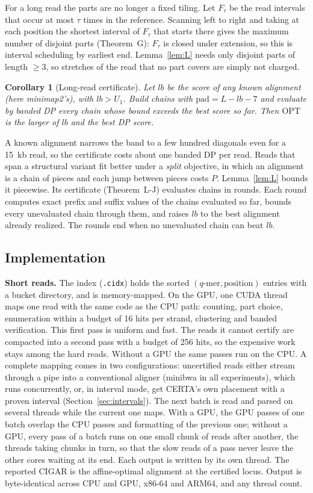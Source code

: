 \documentclass[11pt]{article}
\newtheorem{corollary}[theorem]{Corollary}
\theoremstyle{definition}
\newcommand{\OPT}{\mathrm{OPT}}
\newcommand{\pad}{\mathrm{pad}}
\begin{document}
For a long read the parts are no longer a fixed tiling. Let $F_\tau$ be the
read intervals that occur at most $\tau$ times in the reference. Scanning
left to right and taking at each position the shortest interval of
$F_\tau$ that starts there gives the maximum number of disjoint parts
(Theorem~G): $F_\tau$ is closed under extension, so this is interval
scheduling by earliest end. Lemma~\ref{lem:L} needs only disjoint parts of
length $\ge3$, so stretches of the read that no part covers are simply not
charged.

\begin{corollary}[Long-read certificate]\label{cor:long}
Let $lb$ be the score of any known alignment (here minimap2's), with
$lb>U_1$. Build chains with $\pad=L-lb-7$ and evaluate by banded DP every
chain whose bound exceeds the best score so far. Then $\OPT$ is the larger
of $lb$ and the best DP score.
\end{corollary}

A known alignment narrows the band to a few hundred diagonals even for a
15~kb read, so the certificate costs about one banded DP per read. Reads
that span a structural variant fit better under a \emph{split}
objective, in which an alignment is a chain of pieces and each jump between
pieces costs $P$. Lemma~\ref{lem:L} bounds it piecewise. Its certificate
(Theorem~L-J) evaluates chains in rounds. Each round computes exact
prefix and suffix values of the chains evaluated so far, bounds every
unevaluated chain through them, and raises $lb$ to the best alignment
already realized. The rounds end when no unevaluated chain can beat $lb$.

\subsection{Implementation}

\textbf{Short reads.} The index (\texttt{.cidx}) holds the sorted
$(q\text{-mer}, \text{position})$ entries with a bucket directory, and is
memory-mapped. On the GPU, one CUDA thread maps one read with the same
code as the CPU path: counting, part choice, enumeration within a budget
of 16 hits per strand, clustering and banded verification. This first pass
is uniform and fast. The reads it cannot certify are compacted into a
second pass with a budget of 256 hits, so the expensive work stays among
the hard reads. Without a GPU the same passes run on the CPU. A complete
mapping comes in two configurations: uncertified reads either stream
through a pipe into a conventional aligner (minibwa in all experiments),
which runs concurrently, or, in interval mode, get CERTA's own placement
with a proven interval (Section~\ref{sec:intervals}). The next batch is
read and parsed on several threads while the current one maps. With a GPU,
the GPU passes of one batch overlap the CPU passes and formatting of the
previous one; without a GPU, every pass of a batch runs on one small chunk
of reads after another, the threads taking chunks in turn, so that the
slow reads of a pass never leave the other cores waiting at its end. Each
output is written by its own thread. The reported CIGAR is the affine-optimal
alignment at the certified locus. Output is byte-identical across CPU and
GPU, x86-64 and ARM64, and any thread count.
\end{document}
